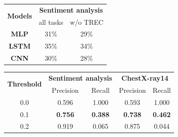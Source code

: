 \begin{table}[!b]
\begin{minipage}[t]{.40\textwidth}
	\vspace{-0.1in}
	\centering
	\begin{tabular}{c c c}
		\toprule
		\multirow{2}{*}{{\bf Models}} & \multicolumn{2}{c}{\bf Sentiment analysis} \\
		& all tasks & w/o TREC \\
		\midrule
		{\bf MLP}  & 31\% & 29\% \\
		{\bf LSTM} & 35\% & 34\% \\
		{\bf CNN}  & 30\% & 28\% \\
		\bottomrule
		\end{tabular}
	\vspace{0.1in}
	\label{tab:taskonomy}
\end{minipage}%
\quad
\begin{minipage}[t]{.58\textwidth}
	\vspace{-0.1in}
	\centering
  \begin{tabular}{c c c c c}
	\toprule
		\multirow{2}{*}{{\bf Threshold}}  & \multicolumn{2}{c}{{\bf Sentiment
		analysis}} & \multicolumn{2}{c}{{\bf ChestX-ray14}} \\
		& Precision &  Recall & Precision &  Recall \\
		\cmidrule(lr){1-1} \cmidrule(lr){2-3} \cmidrule(lr){4-5}
		0.0 & 0.596 & 1.000 & 0.593 & 1.000 \\
		0.1 & \textbf{0.756} & \textbf{0.388} & \textbf{0.738} & \textbf{0.462} \\
		0.2 & 0.919 & 0.065 & 0.875 & 0.044 \\
	\bottomrule
	\end{tabular}
	\vspace{0.1in}
	\label{tab:mtl_better_than_stl}
\end{minipage}
\end{table}

